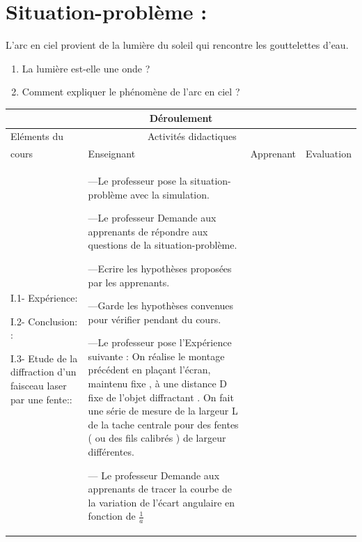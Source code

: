 \documentclass[12pt]{article}
\begin{document}
\section*{Situation-problème :}
L’arc en ciel provient de la lumière du soleil qui rencontre les gouttelettes d’eau.


\begin{enumerate}
	\item La lumière est-elle une onde ?
	\item Comment expliquer le phénomène de l’arc en ciel ?
\end{enumerate}

\begin{center}
	 \begin{tabular}{|p{}||p{}||p{}||p{}|}
\hline
\multicolumn{4}{|c|}{Déroulement}\\\hline
Eléments du & \multicolumn{2}{c||}{Activités didactiques} &  \\\cline{2-3}
cours & Enseignant & Apprenant & Evaluation\\\hline

\color{red}{I- Mise en évidence expérimentale de la diffraction de la lumière}	 

\vspace{0.5cm}
\color{blue}I.1- Expérience:
\vspace{0.5cm}

\color{blue}I.2- Conclusion: :
\vspace{0.5cm}

\color{blue}I.3- Etude de la diffraction d’un faisceau laser par une fente::
\vspace{0.5cm}

	  &
---Le professeur pose la situation-problème avec la simulation.

---Le professeur Demande aux apprenants de répondre aux questions de la situation-problème.

---Ecrire les hypothèses proposées par les apprenants.

---Garde les hypothèses convenues pour vérifier pendant
du cours.

---Le professeur pose l'Expérience suivante :
On réalise le montage précédent en plaçant l’écran, maintenu fixe , à une distance D fixe de
l’objet diffractant . On fait une série de mesure de la largeur L de la tache centrale pour des fentes (
ou des fils calibrés ) de largeur  différentes.


--- Le professeur Demande aux apprenants de tracer la courbe de la variation de l’écart angulaire en fonction de $\frac{1}{a}$


\end{tabular}
\end{center}
\end{document}
